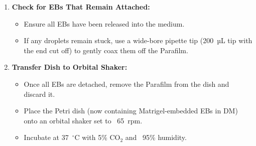 \documentclass[11pt]{article}
\begin{document}
\begin{enumerate}[leftmargin=*]
\begin{enumerate}[leftmargin=*]
        \item \textbf{Check for EBs That Remain Attached:}
        \begin{itemize}[leftmargin=*]
            \item Ensure all EBs have been released into the medium.
            \item If any droplets remain stuck, use a wide-bore pipette tip (200~µL tip with the end cut off) to gently coax them off the Parafilm.
        \end{itemize}

        \item \textbf{Transfer Dish to Orbital Shaker:}
        \begin{itemize}[leftmargin=*]
            \item Once all EBs are detached, remove the Parafilm from the dish and discard it.
            \item Place the Petri dish (now containing Matrigel-embedded EBs in DM) onto an orbital shaker set to ~65~rpm.
            \item Incubate at 37~$^\circ$C with 5\% CO$_2$ and ~95\% humidity.
        \end{itemize}
    \end{enumerate}
\end{enumerate}
\end{document}
